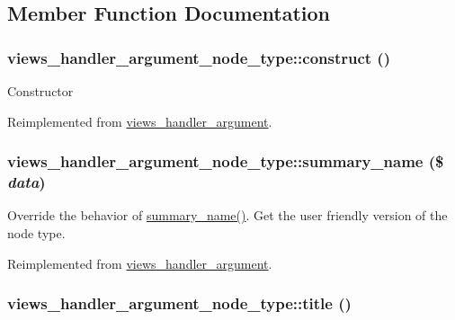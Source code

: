 \subsection{Member Function Documentation}
\hypertarget{classviews__handler__argument__node__type_46ce861fa61b59bb22f001501c3b2650}{
\subsubsection[{construct}]{\setlength{\rightskip}{0pt plus 5cm}views\_\-handler\_\-argument\_\-node\_\-type::construct ()}}
\label{classviews__handler__argument__node__type_46ce861fa61b59bb22f001501c3b2650}


Constructor 

Reimplemented from \hyperlink{classviews__handler__argument_93594a31e95e1a14cead4f038d7b321b}{views\_\-handler\_\-argument}.\hypertarget{classviews__handler__argument__node__type_e4200f641b598c219f733f10386f7d90}{
\subsubsection[{summary\_\-name}]{\setlength{\rightskip}{0pt plus 5cm}views\_\-handler\_\-argument\_\-node\_\-type::summary\_\-name (\$ {\em data})}}
\label{classviews__handler__argument__node__type_e4200f641b598c219f733f10386f7d90}


Override the behavior of \hyperlink{classviews__handler__argument__node__type_e4200f641b598c219f733f10386f7d90}{summary\_\-name()}. Get the user friendly version of the node type. 

Reimplemented from \hyperlink{classviews__handler__argument_4c55a340453eed4d35c69f7ac790cac1}{views\_\-handler\_\-argument}.\hypertarget{classviews__handler__argument__node__type_c17f7b9733895da68b132e6b97dcc917}{
\subsubsection[{title}]{\setlength{\rightskip}{0pt plus 5cm}views\_\-handler\_\-argument\_\-node\_\-type::title ()}}
\label{classviews__handler__argument__node__type_c17f7b9733895da68b132e6b97dcc917}


